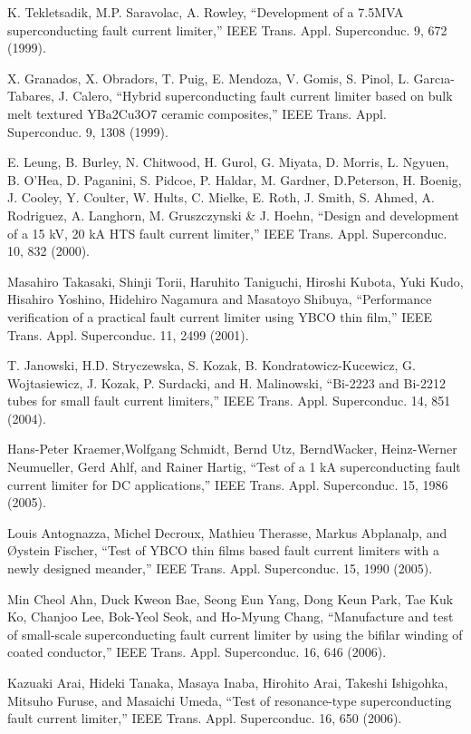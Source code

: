 \noindent [9.125] K. Tekletsadik, M.P. Saravolac, A. Rowley, ``Development of a 7.5MVA superconducting
fault current limiter,” IEEE Trans. Appl. Superconduc. 9, 672 (1999).

\noindent [9.126] X. Granados, X. Obradors, T. Puig, E. Mendoza, V. Gomis, S. Pinol, L. Garcıa-Tabares, J. Calero, ``Hybrid superconducting fault current limiter based on bulk melt textured YBa2Cu3O7 ceramic composites,” IEEE Trans. Appl. Superconduc.
9, 1308 (1999).

\noindent [9.127] E. Leung, B. Burley, N. Chitwood, H. Gurol, G. Miyata, D. Morris, L. Ngyuen,
B. O’Hea, D. Paganini, S. Pidcoe, P. Haldar, M. Gardner, D.Peterson, H. Boenig,
J. Cooley, Y. Coulter, W. Hults, C. Mielke, E. Roth, J. Smith, S. Ahmed, A. Rodriguez,
A. Langhorn, M. Gruszczynski \& J. Hoehn, ``Design and development of
a 15 kV, 20 kA HTS fault current limiter,” IEEE Trans. Appl. Superconduc. 10,
832 (2000).

\noindent [9.128] Masahiro Takasaki, Shinji Torii, Haruhito Taniguchi, Hiroshi Kubota, Yuki Kudo,
Hisahiro Yoshino, Hidehiro Nagamura and Masatoyo Shibuya, ``Performance verification
of a practical fault current limiter using YBCO thin film,” IEEE Trans.
Appl. Superconduc. 11, 2499 (2001).

\noindent [9.129] T. Janowski, H.D. Stryczewska, S. Kozak, B. Kondratowicz-Kucewicz, G. Wojtasiewicz,
J. Kozak, P. Surdacki, and H. Malinowski, ``Bi-2223 and Bi-2212 tubes
for small fault current limiters,” IEEE Trans. Appl. Superconduc. 14, 851 (2004).

\noindent [9.130] Hans-Peter Kraemer,Wolfgang Schmidt, Bernd Utz, BerndWacker, Heinz-Werner
Neumueller, Gerd Ahlf, and Rainer Hartig, ``Test of a 1 kA superconducting fault
current limiter for DC applications,” IEEE Trans. Appl. Superconduc. 15, 1986
(2005).

\noindent [9.131] Louis Antognazza, Michel Decroux, Mathieu Therasse, Markus Abplanalp, and Øystein Fischer, ``Test of YBCO thin films based fault current limiters with a newly designed meander,” IEEE Trans. Appl. Superconduc. 15, 1990 (2005).

\noindent [9.132] Min Cheol Ahn, Duck Kweon Bae, Seong Eun Yang, Dong Keun Park, Tae Kuk
Ko, Chanjoo Lee, Bok-Yeol Seok, and Ho-Myung Chang, ``Manufacture and test
of small-scale superconducting fault current limiter by using the bifilar winding
of coated conductor,” IEEE Trans. Appl. Superconduc. 16, 646 (2006).

\noindent [9.133] Kazuaki Arai, Hideki Tanaka, Masaya Inaba, Hirohito Arai, Takeshi Ishigohka,
Mitsuho Furuse, and Masaichi Umeda, ``Test of resonance-type superconducting
fault current limiter,” IEEE Trans. Appl. Superconduc. 16, 650 (2006).

